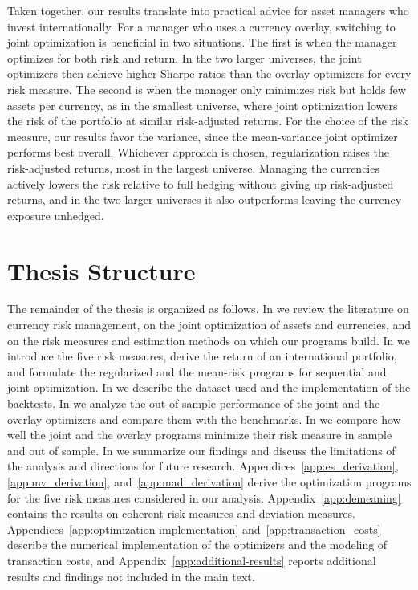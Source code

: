 Taken together, our results translate into practical advice for asset managers who invest internationally. For a
manager who uses a currency overlay, switching to joint optimization is beneficial in two situations. The first is
when the manager optimizes for both risk and return. In the two larger universes, the joint optimizers then achieve higher
Sharpe ratios than the overlay optimizers for every risk measure. The second is when the manager only minimizes risk but holds
few assets per currency, as in the smallest universe, where joint optimization lowers the risk of the portfolio at
similar risk-adjusted returns. For the choice of the risk measure, our results favor the variance, since the mean-variance joint optimizer performs
best overall. Whichever approach is chosen, regularization
raises the risk-adjusted returns, most in the largest universe. Managing the currencies actively 
lowers the risk relative to full hedging without giving up risk-adjusted returns, and in the 
two larger universes it also outperforms leaving
the currency exposure unhedged.


\section{Thesis Structure}

The remainder of the thesis is organized as follows. In  we review the literature on
currency risk management, on the joint optimization of assets and currencies, and on the risk measures and estimation
methods on which our programs build. In  we introduce the five risk measures, derive
the return of an international portfolio, and formulate the regularized and the mean-risk programs for sequential and
joint optimization. In  we describe the dataset used and the implementation of the
backtests. In  we analyze the out-of-sample performance of the joint and the overlay
optimizers and compare them with the benchmarks. In  we compare how well the joint and
the overlay programs minimize their risk measure in sample and out of sample. In  we summarize our
findings and discuss the limitations of the analysis and directions for future research. Appendices~\ref{app:es_derivation},
\ref{app:mv_derivation}, and~\ref{app:mad_derivation} derive the optimization programs for the five risk measures considered in our analysis.
Appendix~\ref{app:demeaning} contains the results on coherent risk measures and deviation measures.
Appendices~\ref{app:optimization-implementation} and~\ref{app:transaction_costs} describe the numerical implementation of the optimizers
and the modeling of transaction costs, and Appendix~\ref{app:additional-results} reports additional results and findings not included in the main text.
